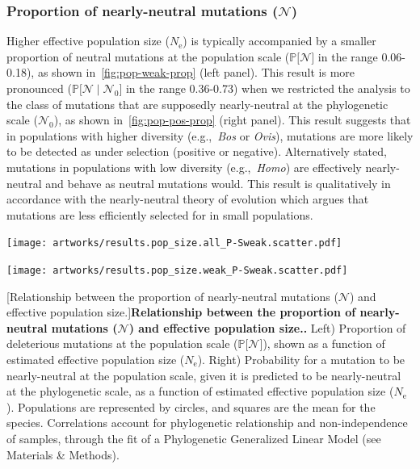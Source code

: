 \documentclass{article}
\newcommand{\Ne}{N_{\text{e}}}
\newcommand{\proba}{\mathbb{P}}
\newcommand{\SphyNeu}{\mathcal{N}_0}
\newcommand{\given}{\mid}
\newcommand{\SpopNeu}{\mathcal{N}}
\begin{document}
    \subsubsection{Proportion of nearly-neutral mutations (\texorpdfstring{$\SpopNeu$}{N})}\label{subsec:proportion-nearly-neutral-mutations}
    Higher effective population size ($\Ne$) is typically accompanied by a smaller proportion of neutral mutations at the population scale ($\proba{[} \SpopNeu {]}$ in the range 0.06-0.18), as shown in~\ref{fig:pop-weak-prop} (left panel).
    This result is more pronounced ($\proba{[} \SpopNeu \given \SphyNeu {]}$ in the range 0.36-0.73) when we restricted the analysis to the class of mutations that are supposedly nearly-neutral at the phylogenetic scale ($\SphyNeu$), as shown in~\ref{fig:pop-pos-prop} (right panel).
    This result suggests that in populations with higher diversity (e.g.,~\textit{Bos} or \textit{Ovis}), mutations are more likely to be detected as under selection (positive or negative).
    Alternatively stated, mutations in populations with low diversity (e.g.,~\textit{Homo}) are effectively nearly-neutral and behave as neutral mutations would.
    This result is qualitatively in accordance with the nearly-neutral theory of evolution which argues that mutations are less efficiently selected for in small populations.

    \newpage
    \begin{center}
        \begin{minipage}{0.49\linewidth}
            \texttt{[image: artworks/results.pop\_size.all\_P-Sweak.scatter.pdf]}
        \end{minipage}
        \begin{minipage}{0.49\linewidth}
            \texttt{[image: artworks/results.pop\_size.weak\_P-Sweak.scatter.pdf]}
        \end{minipage}
        [Relationship between the proportion of nearly-neutral mutations ($\SpopNeu$) and effective population size.]{\textbf{Relationship between the proportion of nearly-neutral mutations ($\bm{\SpopNeu}$) and effective population size..}
        Left) Proportion of deleterious mutations at the population scale ($\proba{[} \SpopNeu{]}$), shown as a function of estimated effective population size ($\Ne$). Right) Probability for a mutation to be nearly-neutral at the population scale, given it is predicted to be nearly-neutral at the phylogenetic scale, as a function of estimated effective population size ($\Ne$). Populations are represented by circles, and squares are the mean for the species. Correlations account for phylogenetic relationship and non-independence of samples, through the fit of a Phylogenetic Generalized Linear Model (see Materials \& Methods).\label{fig:pop-weak-prop}}
    \end{center}
\end{document}
